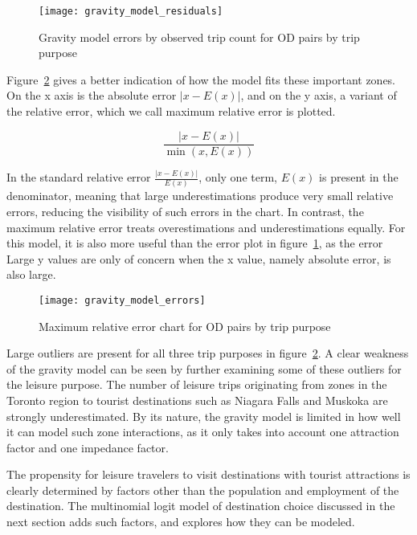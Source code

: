 \begin{figure}[H]
\centering
\texttt{[image: gravity\_model\_residuals]}
\caption{Gravity model errors by observed trip count for OD pairs by trip purpose}
\label{fig:gravity-residuals}
\end{figure}

Figure~\ref{fig:gravity-errors} gives a better indication of how the model fits these important zones. On the x axis is the absolute error $|x - E(x)|$, and on the y axis, a variant of the relative error, which we call maximum relative error is plotted. 

$$\frac{|x-E(x)|}{\min(x, E(x))}$$

In the standard relative error $\frac{|x-E(x)|}{E(x)}$, only one term, $E(x)$ is present in the denominator, meaning that large underestimations produce very small relative errors, reducing the visibility of such errors in the chart. In contrast, the maximum relative error treats overestimations and underestimations equally. For this model, it is also more useful than the error plot in figure~\ref{fig:gravity-residuals}, as the error Large y values are only of concern when the x value, namely absolute error, is also large.

\begin{figure}[H]
\centering
\texttt{[image: gravity\_model\_errors]}
\caption{Maximum relative error chart for OD pairs by trip purpose}
\label{fig:gravity-errors}

\end{figure}

Large outliers are present for all three trip purposes in figure~\ref{fig:gravity-errors}. A clear weakness of the gravity model can be seen by further examining some of these outliers for the leisure purpose. The number of leisure trips originating from zones in the Toronto region to tourist destinations such as Niagara Falls and Muskoka are strongly underestimated. By its nature, the gravity model is limited in how well it can model such zone interactions, as it only takes into account one attraction factor and one impedance factor.

The propensity for leisure travelers to visit destinations with tourist attractions is clearly determined by factors other than the population and employment of the destination. The multinomial logit model of destination choice discussed in the next section adds such factors, and explores how they can be modeled.

